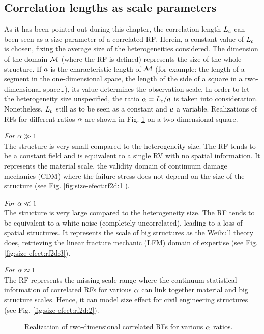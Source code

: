 \documentclass[12pt]{article}
\begin{document}
\subsection{Correlation lengths as scale parameters}
As it has been pointed out during this chapter, the correlation length $L_c$ can been seen as a size parameter of a correlated RF. Herein, a constant value of $L_c$ is chosen, fixing the average size of the heterogeneities considered. The dimension of the domain $\mathcal{M}$ (where the RF is defined) represents the size of the whole structure. If $a$ is the characteristic length of $\mathcal{M}$ (for example: the length of a segment in the one-dimensional space, the length of the side of a square in a two-dimensional space\dots), its value determines the observation scale. In order to let the heterogeneity size unspecified, the ratio $\alpha=L_c/a$ is taken into consideration. Nonetheless, $L_c$ still as to be seen as a constant and $a$ a variable. Realizations of RFs for different ratios $\alpha$ are shown in Fig. \ref{fig:size-efect:rf2d} on a two-dimensional square.
\begin{description}
  \item \emph{For $\alpha \gg 1$} \\ The structure is very small compared to the heterogeneity size. The RF tends to be a constant field and is equivalent to a single RV with no spatial information. It represents the material scale, the validity domain of continuum damage mechanics (CDM) where the failure stress does not depend on the size of the structure (see Fig. \ref{fig:size-efect:rf2d:1}).
  \item \emph{For $\alpha \ll 1$} \\ The structure is very large compared to the heterogeneity size. The RF tends to be equivalent to a white noise (completely uncorrelated), leading to a loss of spatial structures. It represents the scale of big structures as the Weibull theory does, retrieving the linear fracture mechanic (LFM) domain of expertise (see Fig. \ref{fig:size-efect:rf2d:3}).
  \item \emph{For $\alpha \approx 1$} \\ The RF represents the missing scale range where the continuum statistical information of correlated RFs for various $\alpha$ can link together material and big structure scales. Hence, it can model size effect for civil engineering structures (see Fig. \ref{fig:size-efect:rf2d:2}).
\end{description}
\begin{figure}[h!]
  \centering\hspace*{\fill}
  \hfill
  \hfill
  \hspace*{\fill}
  \caption{Realization of two-dimensional correlated RFs for various $\alpha$ ratios.\label{fig:size-efect:rf2d}}
\end{figure}
\end{document}
